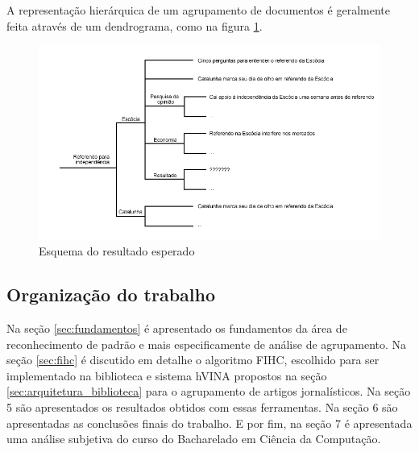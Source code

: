\documentclass[a4paper,12pt]{article}
\begin{document}
A representação hierárquica de um agrupamento de documentos é geralmente feita através de um dendrograma, como na figura \ref{fig:resultado}.

\begin{figure}[H]
    \begin{center}
        \includegraphics[scale=0.5]{resultado.png}
    \end{center}
    \caption{Esquema do resultado esperado}
    \label{fig:resultado}
\end{figure}

\subsection{Organização do trabalho}


Na seção \ref{sec:fundamentos} é apresentado os fundamentos da área de reconhecimento de padrão e mais especificamente de análise de agrupamento. Na seção \ref{sec:fihc} é discutido em detalhe o algoritmo FIHC, escolhido para ser implementado na biblioteca e sistema hVINA propostos na seção \ref{sec:arquitetura_biblioteca} para o agrupamento de artigos jornalísticos. Na seção 5 são apresentados os resultados obtidos com essas ferramentas. Na seção 6 são apresentadas as conclusões finais do trabalho. E por fim, na seção 7 é apresentada uma análise subjetiva do curso do Bacharelado em Ciência da Computação.
\end{document}
